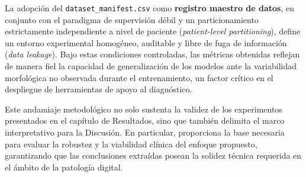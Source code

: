 La adopción del \texttt{dataset\_manifest.csv} como \textbf{registro maestro de datos}, en conjunto con el paradigma de supervisión débil y un particionamiento estrictamente independiente a nivel de paciente (\textit{patient-level partitioning}), define un entorno experimental homogéneo, auditable y libre de fuga de información (\textit{data leakage}). Bajo estas condiciones controladas, las métricas obtenidas reflejan de manera fiel la capacidad de generalización de los modelos ante la variabilidad morfológica no observada durante el entrenamiento, un factor crítico en el despliegue de herramientas de apoyo al diagnóstico.\newline

Este andamiaje metodológico no solo sustenta la validez de los experimentos presentados en el capítulo de Resultados, sino que también delimita el marco interpretativo para la Discusión. En particular, proporciona la base necesaria para evaluar la robustez y la viabilidad clínica del enfoque propuesto, garantizando que las conclusiones extraídas posean la solidez técnica requerida en el ámbito de la patología digital.

